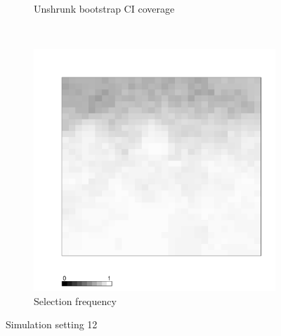 \documentclass[authoryear, review, 11pt]{elsarticle}
\begin{document}
\begin{figure}
\begin{subfigure}[b]{0.45\textwidth}
		\caption{Unshrunk bootstrap CI coverage}
	\end{subfigure}%
	~ %
	\begin{subfigure}[b]{0.45\textwidth}
	\centering
		\includegraphics[width=\textwidth]{../../figures/simulation/X1.15.12.selection.pdf}
		\caption{Selection frequency}
	\end{subfigure}
	\caption{Simulation setting 12}
\end{figure}
\end{document}
